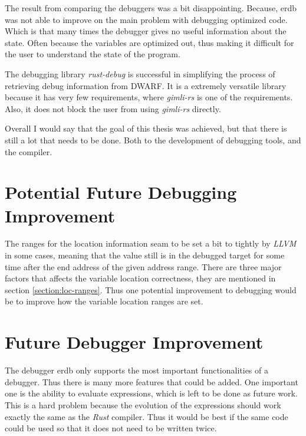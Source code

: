 

The result from comparing the debuggers was a bit disappointing.
Because, \gls{erdb} was not able to improve on the main problem with debugging optimized code.
Which is that many times the debugger gives no useful information about the state.
Often because the variables are optimized out, thus making it difficult for the user to understand the state of the program.


The debugging library \emph{rust-debug} is successful in simplifying the process of retrieving debug information from \gls{DWARF}.
It is a extremely versatile library because it has very few requirements, where \emph{gimli-rs} is one of the requirements.
Also, it does not block the user from using \emph{gimli-rs} directly.


Overall I would say that the goal of this thesis was achieved, but that there is still a lot that needs to be done.
Both to the development of debugging tools, and the compiler.


\section{Potential Future Debugging Improvement}
The ranges for the location information seam to be set a bit to tightly by \emph{LLVM} in some cases, meaning that the value still is in the debugged target for some time after the end address of the given address range.
There are three major factors that affects the variable location correctness, they are mentioned in section \ref{section:loc-ranges}.
Thus one potential improvement to debugging would be to improve how the variable location ranges are set.


\section{Future Debugger Improvement}
The debugger \gls{erdb} only supports the most important functionalities of a debugger.
Thus there is many more features that could be added.
One important one is the ability to evaluate expressions, which is left to be done as future work.
This is a hard problem because the evolution of the expressions should work exactly the same as the \emph{Rust} compiler.
Thus it would be best if the same code could be used so that it does not need to be written twice.


